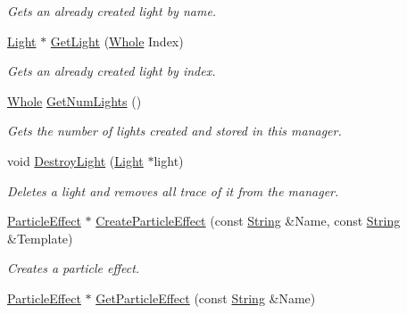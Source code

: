 \begin{DoxyCompactItemize}
\begin{DoxyCompactList}\small\item\em Gets an already created light by name. \item\end{DoxyCompactList}\item 
\hyperlink{classphys_1_1Light}{Light} $\ast$ \hyperlink{classphys_1_1SceneManager_a1bdec8167e4cb2d958272a25148409ab}{GetLight} (\hyperlink{namespacephys_a460f6bc24c8dd347b05e0366ae34f34a}{Whole} Index)
\begin{DoxyCompactList}\small\item\em Gets an already created light by index. \item\end{DoxyCompactList}\item 
\hyperlink{namespacephys_a460f6bc24c8dd347b05e0366ae34f34a}{Whole} \hyperlink{classphys_1_1SceneManager_a41a5cddefca0c957fdeeb37f97cc6070}{GetNumLights} ()
\begin{DoxyCompactList}\small\item\em Gets the number of lights created and stored in this manager. \item\end{DoxyCompactList}\item 
void \hyperlink{classphys_1_1SceneManager_a0f6ebec4e8a372b0fcc2b2205bac7725}{DestroyLight} (\hyperlink{classphys_1_1Light}{Light} $\ast$light)
\begin{DoxyCompactList}\small\item\em Deletes a light and removes all trace of it from the manager. \item\end{DoxyCompactList}\item 
\hyperlink{classphys_1_1ParticleEffect}{ParticleEffect} $\ast$ \hyperlink{classphys_1_1SceneManager_a67a33ba38c8e8b198c52ca7bcf847751}{CreateParticleEffect} (const \hyperlink{namespacephys_aa03900411993de7fbfec4789bc1d392e}{String} \&Name, const \hyperlink{namespacephys_aa03900411993de7fbfec4789bc1d392e}{String} \&Template)
\begin{DoxyCompactList}\small\item\em Creates a particle effect. \item\end{DoxyCompactList}\item 
\hyperlink{classphys_1_1ParticleEffect}{ParticleEffect} $\ast$ \hyperlink{classphys_1_1SceneManager_ab1afc8a739b5f9756b9d7f5a26f2913b}{GetParticleEffect} (const \hyperlink{namespacephys_aa03900411993de7fbfec4789bc1d392e}{String} \&Name)

\end{DoxyCompactItemize}
